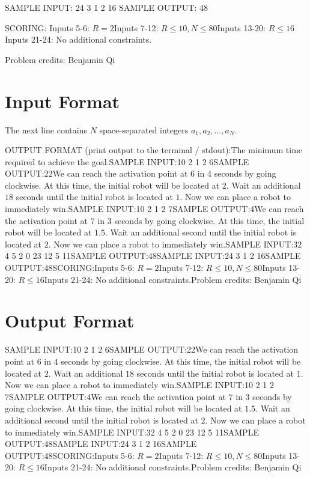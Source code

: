 \documentclass[12pt]{article}
\begin{document}
SAMPLE INPUT:
24 3 1 2
16
SAMPLE OUTPUT: 
48

SCORING:
Inputs 5-6: $R=2$Inputs 7-12: $R\le 10, N\le 80$Inputs 13-20: $R\le 16$Inputs 21-24: No additional constraints.


Problem credits: Benjamin Qi



\section*{Input Format}
The next line contains $N$ space-separated integers $a_1,a_2,\dots,a_N$.

OUTPUT FORMAT (print output to the terminal / stdout):The minimum time required to achieve the goal.SAMPLE INPUT:10 2 1 2
6SAMPLE OUTPUT:22We can reach the activation point at $6$ in $4$ seconds by going clockwise. At
this time, the initial robot will be located at $2$. Wait an additional $18$
seconds until the initial robot is located at $1$. Now we can place a robot to
immediately win.SAMPLE INPUT:10 2 1 2
7SAMPLE OUTPUT:4We can reach the activation point at $7$ in $3$ seconds by going clockwise. At
this time, the initial robot will be located at $1.5$. Wait an additional second
until the initial robot is located at $2$. Now we can place a robot to
immediately win.SAMPLE INPUT:32 4 5 2
0 23 12 5 11SAMPLE OUTPUT:48SAMPLE INPUT:24 3 1 2
16SAMPLE OUTPUT:48SCORING:Inputs 5-6: $R=2$Inputs 7-12: $R\le 10, N\le 80$Inputs 13-20: $R\le 16$Inputs 21-24: No additional constraints.Problem credits: Benjamin Qi

\section*{Output Format}
SAMPLE INPUT:10 2 1 2
6SAMPLE OUTPUT:22We can reach the activation point at $6$ in $4$ seconds by going clockwise. At
this time, the initial robot will be located at $2$. Wait an additional $18$
seconds until the initial robot is located at $1$. Now we can place a robot to
immediately win.SAMPLE INPUT:10 2 1 2
7SAMPLE OUTPUT:4We can reach the activation point at $7$ in $3$ seconds by going clockwise. At
this time, the initial robot will be located at $1.5$. Wait an additional second
until the initial robot is located at $2$. Now we can place a robot to
immediately win.SAMPLE INPUT:32 4 5 2
0 23 12 5 11SAMPLE OUTPUT:48SAMPLE INPUT:24 3 1 2
16SAMPLE OUTPUT:48SCORING:Inputs 5-6: $R=2$Inputs 7-12: $R\le 10, N\le 80$Inputs 13-20: $R\le 16$Inputs 21-24: No additional constraints.Problem credits: Benjamin Qi
\end{document}
